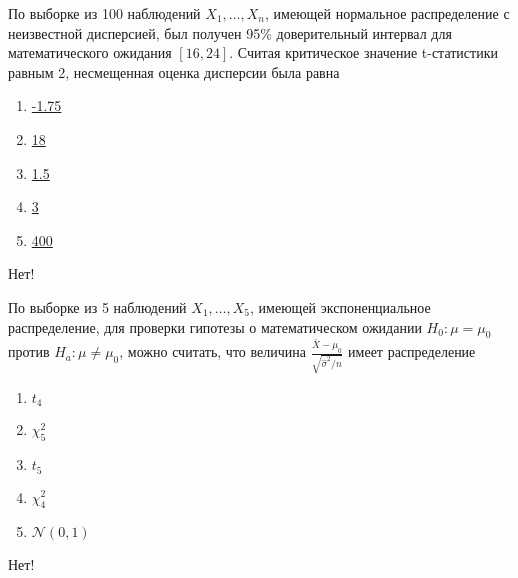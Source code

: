 \documentclass[t]{beamer}
\newcommand{\cN}{\mathcal{N}}
\begin{document}
 \begin{frame} \label{36-No} 
\begin{block}{36} 

  По выборке из 100 наблюдений $X_1,\ldots,X_{n}$, имеющей нормальное распределение с неизвестной дисперсией, был получен 95\% доверительный интервал для математического ожидания $[16,24]$. Считая критическое значение t-статистики равным 2, несмещенная оценка дисперсии была равна


 \end{block} 
\begin{enumerate} 
\item[] \hyperlink{36-No}{\beamergotobutton{} -1.75}
\item[] \hyperlink{36-No}{\beamergotobutton{} 18}
\item[] \hyperlink{36-No}{\beamergotobutton{} 1.5}
\item[] \hyperlink{36-No}{\beamergotobutton{} 3}
\item[] \hyperlink{36-Yes}{\beamergotobutton{} 400}
\end{enumerate} 

 \alert{Нет!} 
\end{frame} 


 \begin{frame} \label{37-No} 
\begin{block}{37} 

  По выборке из 5 наблюдений $X_1,\ldots,X_{5}$, имеющей экспоненциальное распределение, для проверки гипотезы о математическом ожидании $H_0: \mu = \mu_0$ против $H_a: \mu \ne \mu_0$, можно считать, что величина $\frac{\bar{X} - \mu_0}{\sqrt{\hat{\sigma}^2 / n}}$ имеет распределение


 \end{block} 
\begin{enumerate} 
\item[] \hyperlink{37-No}{\beamergotobutton{} $t_4$}
\item[] \hyperlink{37-No}{\beamergotobutton{} $\chi^2_5$}
\item[] \hyperlink{37-No}{\beamergotobutton{} $t_5$}
\item[] \hyperlink{37-No}{\beamergotobutton{} $\chi^2_4$}
\item[] \hyperlink{37-No}{\beamergotobutton{} $\cN(0,1)$}
\end{enumerate} 

 \alert{Нет!} 
\end{frame} 
\end{document}
